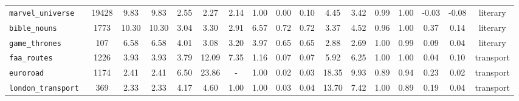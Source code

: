 \documentclass[11pt]{article}
\begin{document}
\begin{table}[htbp]
{\begin{tabular}{l|c|c|c|c|c|c|c|c|c|c|c|c|c|c|c|c}
\texttt{marvel\_universe}~ & 19428 & 9.83 & 9.83 & 2.55 & 2.27 & 2.14 & 1.00 & 0.00 & 0.10 & 4.45 & 3.42 & 0.99 & 1.00 & -0.03 & -0.08 & literary   \\
\texttt{bible\_nouns}~ & 1773 & 10.30 & 10.30 & 3.04 & 3.30 & 2.91 & 6.57 & 0.72 & 0.72 & 3.37 & 4.52 & 0.96 & 1.00 & 0.37 & 0.14 & literary  \\
\texttt{game\_thrones}~ & 107 & 6.58 & 6.58 & 4.01 & 3.08 & 3.20 & 3.97 & 0.65 & 0.65 & 2.88 & 2.69 & 1.00 & 0.99 & 0.09 & 0.04 & literary  \\
\texttt{faa\_routes}~ & 1226 & 3.93 & 3.93 & 3.79 & 12.09 & 7.35 & 1.16 & 0.07 & 0.07 & 5.92 & 6.25 & 1.00 & 1.00 & 0.04 & 0.10 & transport  \\
\texttt{euroroad}~ & 1174 & 2.41 & 2.41 & 6.50 & 23.86 & - & 1.00 & 0.02 & 0.03 & 18.35 & 9.93 & 0.89 & 0.94 & 0.23 & 0.02 & transport   \\
\texttt{london\_transport}~ & 369 & 2.33 & 2.33 & 4.17 & 4.60 & 1.00 & 1.00 & 0.03 & 0.04 & 13.70 & 7.42 & 1.00 & 0.89 & 0.19 & 0.04 & transport \\
\end{tabular}
}
\end{table}
\end{document}
